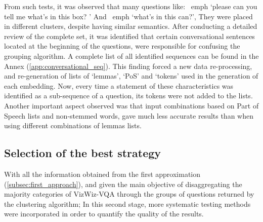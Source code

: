 From such tests, it was observed that many questions like: \ emph {`please can you tell me what's in this box? '} And \ emph {`what's in this can?'}, They were placed in different clusters, despite having similar semantics. After conducting a detailed review of the complete set, it was identified that certain conversational sentences located at the beginning of the questions, were responsible for confusing the grouping algorithm. A complete list of all identified sequences can be found in the Annex (\ref{app:conversational_seq}). This finding forced a new data re-processing, and re-generation of lists of `lemmas', `PoS' and `tokens' used in the generation of each embedding. Now, every time a statement of these characteristics was identified as a sub-sequence of a question, its tokens were not added to the lists.
Another important aspect observed was that input combinations based on Part of Speech lists and non-stemmed words, gave much less accurate results than when using different combinations of lemmas lists.

\subsection{Selection of the best strategy}
\label{subsec:best_strategy}
With all the information obtained from the first approximation (\ref{subsec:first_approach}), and given the main objective of disaggregating the majority categories of VizWiz-VQA through the groups of questions returned by the clustering algorithm; In this second stage, more systematic testing methods were incorporated in order to quantify the quality of the results.

